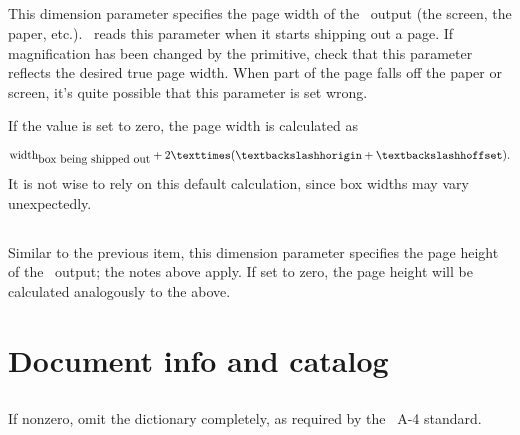 \documentclass{pdftexmanual}
\begin{document}
\subsection{}

This dimension parameter specifies the page width of the \PDF\ output
(the screen, the paper, etc.). \PDFTEX\ reads this parameter when it
starts shipping out a page. If magnification has been changed by the
 primitive, check that this parameter reflects the desired true
page width. When part of the page falls off the paper or screen, it's
quite possible that this parameter is set wrong.

If the value is set to zero, the page width is calculated as

\[
\hbox{\textit{width}}_{\hbox{\scriptsize box being shipped out}}
+ 2 \times (\cs{horigin} + \hbox{\cs{hoffset}}).
\]
It is not wise to rely on this default calculation, since box widths may
vary unexpectedly.

\subsection{}

Similar to the previous item, this dimension parameter specifies the
page height of the \PDF\ output; the notes above apply. If set to zero,
the page height will be calculated analogously to the above.

\section{Document info and catalog}
\label{sec.docinfocatalog}

\subsection{}

If nonzero, omit the  dictionary completely, as required by
the \PDF\ A-4 standard. 

\subsection{}
\end{document}
